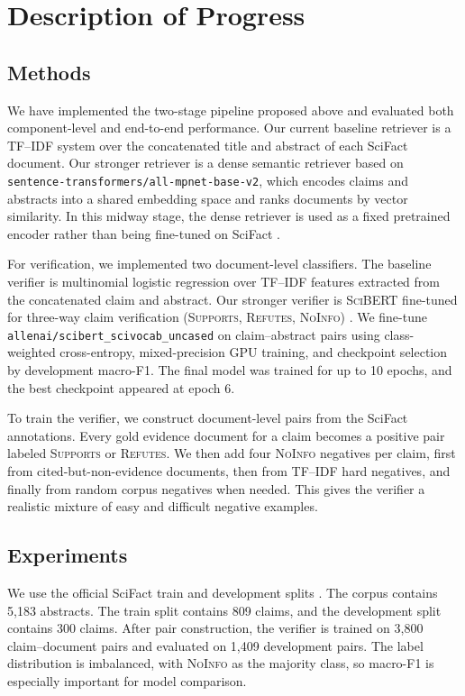\documentclass[11pt]{article}
\begin{document}
\section{Description of Progress}
\subsection{Methods}
We have implemented the two-stage pipeline proposed above and evaluated both component-level and end-to-end performance. Our current baseline retriever is a TF--IDF system over the concatenated title and abstract of each SciFact document. Our stronger retriever is a dense semantic retriever based on \texttt{sentence-transformers/all-mpnet-base-v2}, which encodes claims and abstracts into a shared embedding space and ranks documents by vector similarity. In this midway stage, the dense retriever is used as a fixed pretrained encoder rather than being fine-tuned on SciFact \citep{song2020mpnet}.

For verification, we implemented two document-level classifiers. The baseline verifier is multinomial logistic regression over TF--IDF features extracted from the concatenated claim and abstract. Our stronger verifier is \textsc{SciBERT} fine-tuned for three-way claim verification (\textsc{Supports}, \textsc{Refutes}, \textsc{NoInfo}) \citep{beltagy2019scibert}. We fine-tune \texttt{allenai/scibert\_scivocab\_uncased} on claim--abstract pairs using class-weighted cross-entropy, mixed-precision GPU training, and checkpoint selection by development macro-F1. The final model was trained for up to 10 epochs, and the best checkpoint appeared at epoch 6.

To train the verifier, we construct document-level pairs from the SciFact annotations. Every gold evidence document for a claim becomes a positive pair labeled \textsc{Supports} or \textsc{Refutes}. We then add four \textsc{NoInfo} negatives per claim, first from cited-but-non-evidence documents, then from TF--IDF hard negatives, and finally from random corpus negatives when needed. This gives the verifier a realistic mixture of easy and difficult negative examples.

\subsection{Experiments}
We use the official SciFact train and development splits \citep{wadden2020fact}. The corpus contains 5,183 abstracts. The train split contains 809 claims, and the development split contains 300 claims. After pair construction, the verifier is trained on 3,800 claim--document pairs and evaluated on 1,409 development pairs. The label distribution is imbalanced, with \textsc{NoInfo} as the majority class, so macro-F1 is especially important for model comparison.
\end{document}
